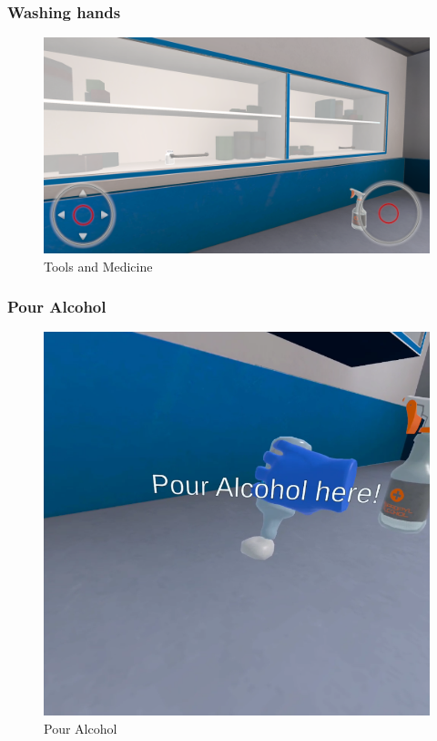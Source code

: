 \subsubsection{Washing hands}
\begin{figure}[h]
	\centering
	\includegraphics[width=0.65\linewidth]{Images/Tools and Medicine.png}
	\caption{Tools and Medicine}
	\label{fig:system-diagram}
\end{figure}

\subsubsection{Pour Alcohol}
\begin{figure}[h]
	\centering
	\includegraphics[width=0.65\linewidth]{Images/Pour Alcohol.png}
	\caption{Pour Alcohol}
	\label{fig:Pour-Alcohol}
\end{figure}

